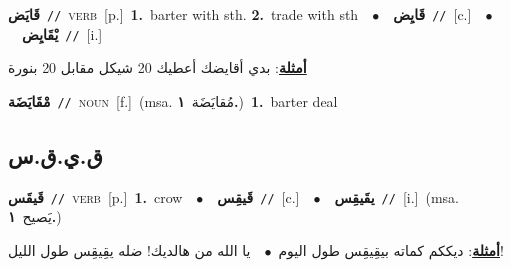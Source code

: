 \documentclass[10pt,a4paper,twoside]{article} %
\begin{document}
\begin{multicols}{2}
{\setlength\topsep{0pt}\textbf{\foreignlanguage{arabic}{قَايَض}}\ {\color{gray}\texttt{//}\color{black}}\ \textsc{verb}\ [p.]\ \textbf{1.}~barter with sth.  \textbf{2.}~trade with sth\ \ $\bullet$\ \ \setlength\topsep{0pt}\textbf{\foreignlanguage{arabic}{قَايِض}}\ {\color{gray}\texttt{//}\color{black}}\ [c.]\ \ $\bullet$\ \ \setlength\topsep{0pt}\textbf{\foreignlanguage{arabic}{يْقَايِض}}\ {\color{gray}\texttt{//}\color{black}}\ [i.]\  \begin{flushright}\color{gray}\foreignlanguage{arabic}{\textbf{\underline{\foreignlanguage{arabic}{أمثلة}}}: بدي أقايضك أعطيك 20 شيكل مقابل 20 بنورة}\end{flushright}\color{black}} \vspace{2mm}

{\setlength\topsep{0pt}\textbf{\foreignlanguage{arabic}{مْقَايَضَة}}\ {\color{gray}\texttt{//}\color{black}}\ \textsc{noun}\ [f.]\ \color{gray}(msa. \foreignlanguage{arabic}{مُقايَضَة}~\foreignlanguage{arabic}{\textbf{١.}})\color{black}\ \textbf{1.}~barter deal\ } \vspace{2mm}

\vspace{-3mm}
\subsection*{\color{blue}\foreignlanguage{arabic}{ق.ي.ق.س}\color{blue}{}} 

{\setlength\topsep{0pt}\textbf{\foreignlanguage{arabic}{قَيقَس}}\ {\color{gray}\texttt{//}\color{black}}\ \textsc{verb}\ [p.]\ \textbf{1.}~crow\ \ $\bullet$\ \ \setlength\topsep{0pt}\textbf{\foreignlanguage{arabic}{قَيقِس}}\ {\color{gray}\texttt{//}\color{black}}\ [c.]\ \ $\bullet$\ \ \setlength\topsep{0pt}\textbf{\foreignlanguage{arabic}{يقَيقِس}}\ {\color{gray}\texttt{//}\color{black}}\ [i.]\ \color{gray}(msa. \foreignlanguage{arabic}{يَصيح}~\foreignlanguage{arabic}{\textbf{١.}})\color{black}\  \begin{flushright}\color{gray}\foreignlanguage{arabic}{\textbf{\underline{\foreignlanguage{arabic}{أمثلة}}}: ديككم كماته بيقِيقِس طول اليوم\ $\bullet$\ \  يا الله من هالديك! ضله يقِيقِس طول الليل!}\end{flushright}\color{black}} \vspace{2mm}


\end{multicols}
\end{document}
